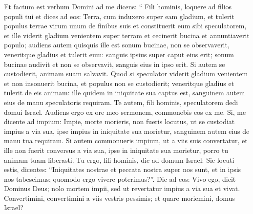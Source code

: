 \begin{biblechapter}
\begin{biblechapter}
\begin{biblechapter}
\begin{biblechapter}
\begin{biblechapter}
\begin{biblechapter}
\begin{biblechapter}
\begin{biblechapter}
\begin{biblechapter}
\begin{biblechapter}
\begin{biblechapter}
\begin{biblechapter}
\begin{biblechapter}
\begin{biblechapter}
\begin{biblechapter}
\begin{biblechapter}
\begin{biblechapter}
\begin{biblechapter}
\begin{biblechapter}
\begin{biblechapter}
\begin{biblechapter}
\begin{biblechapter}
\begin{biblechapter}
\begin{biblechapter}
\begin{biblechapter}
\begin{biblechapter}
\begin{biblechapter}
\begin{biblechapter}
\begin{biblechapter}
\begin{biblechapter}
\begin{biblechapter}
\begin{biblechapter}
\begin{biblechapter}
\verse Et factum est verbum Domini ad me dicens: 
\verse “ Fili hominis, loquere ad filios populi tui et dices ad eos: Terra, cum induxero super eam gladium, et tulerit populus terrae virum unum de finibus suis et constituerit eum sibi speculatorem, 
\verse et ille viderit gladium venientem super terram et cecinerit bucina et annuntiaverit populo; 
\verse audiens autem quisquis ille est sonum bucinae, non se observaverit, veneritque gladius et tulerit eum: sanguis ipsius super caput eius erit; 
\verse sonum bucinae audivit et non se observavit, sanguis eius in ipso erit. Si autem se custodierit, animam suam salvavit. 
\verse Quod si speculator viderit gladium venientem et non insonuerit bucina, et populus non se custodierit; veneritque gladius et tulerit de eis animam: ille quidem in iniquitate sua captus est, sanguinem autem eius de manu speculatoris requiram.
 \verse Te autem, fili hominis, speculatorem dedi domui Israel. Audiens ergo ex ore meo sermonem, commonebis eos ex me. 
\verse Si, me dicente ad impium: Impie, morte morieris, non fueris locutus, ut se custodiat impius a via sua, ipse impius in iniquitate sua morietur, sanguinem autem eius de manu tua requiram. 
\verse Si autem commonueris impium, ut a viis suis convertatur, et ille non fuerit conversus a via sua, ipse in iniquitate sua morietur, porro tu animam tuam liberasti.
 \verse Tu ergo, fili hominis, dic ad domum Israel: Sic locuti estis, dicentes: “Iniquitates nostrae et peccata nostra super nos sunt, et in ipsis nos tabescimus; quomodo ergo vivere poterimus?”. 
\verse Dic ad eos: Vivo ego, dicit Dominus Deus; nolo mortem impii, sed ut revertatur impius a via sua et vivat. Convertimini, convertimini a viis vestris pessimis; et quare moriemini, domus Israel?

\end{biblechapter}
\end{biblechapter}
\end{biblechapter}
\end{biblechapter}
\end{biblechapter}
\end{biblechapter}
\end{biblechapter}
\end{biblechapter}
\end{biblechapter}
\end{biblechapter}
\end{biblechapter}
\end{biblechapter}
\end{biblechapter}
\end{biblechapter}
\end{biblechapter}
\end{biblechapter}
\end{biblechapter}
\end{biblechapter}
\end{biblechapter}
\end{biblechapter}
\end{biblechapter}
\end{biblechapter}
\end{biblechapter}
\end{biblechapter}
\end{biblechapter}
\end{biblechapter}
\end{biblechapter}
\end{biblechapter}
\end{biblechapter}
\end{biblechapter}
\end{biblechapter}
\end{biblechapter}
\end{biblechapter}
